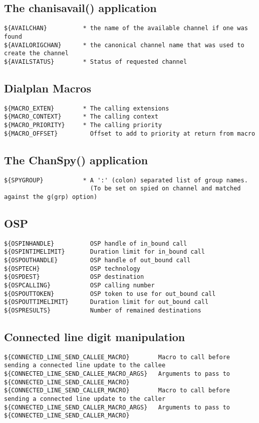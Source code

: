 \subsection{The chanisavail() application}
\begin{verbatim}
${AVAILCHAN}          * the name of the available channel if one was found
${AVAILORIGCHAN}      * the canonical channel name that was used to create the channel
${AVAILSTATUS}        * Status of requested channel
\end{verbatim}

\subsection{Dialplan Macros}
\begin{verbatim}
${MACRO_EXTEN}        * The calling extensions
${MACRO_CONTEXT}      * The calling context
${MACRO_PRIORITY}     * The calling priority
${MACRO_OFFSET}         Offset to add to priority at return from macro
\end{verbatim}

\subsection{The ChanSpy() application}
\begin{verbatim}
${SPYGROUP}           * A ':' (colon) separated list of group names.
                        (To be set on spied on channel and matched against the g(grp) option)
\end{verbatim}

\subsection{OSP}
\begin{verbatim}
${OSPINHANDLE}          OSP handle of in_bound call
${OSPINTIMELIMIT}       Duration limit for in_bound call
${OSPOUTHANDLE}         OSP handle of out_bound call
${OSPTECH}              OSP technology
${OSPDEST}              OSP destination
${OSPCALLING}           OSP calling number
${OSPOUTTOKEN}          OSP token to use for out_bound call
${OSPOUTTIMELIMIT}      Duration limit for out_bound call
${OSPRESULTS}           Number of remained destinations
\end{verbatim}

\subsection{Connected line digit manipulation}
\begin{verbatim}
${CONNECTED_LINE_SEND_CALLEE_MACRO}        Macro to call before sending a connected line update to the callee
${CONNECTED_LINE_SEND_CALLEE_MACRO_ARGS}   Arguments to pass to ${CONNECTED_LINE_SEND_CALLEE_MACRO}
${CONNECTED_LINE_SEND_CALLER_MACRO}        Macro to call before sending a connected line update to the caller
${CONNECTED_LINE_SEND_CALLER_MACRO_ARGS}   Arguments to pass to ${CONNECTED_LINE_SEND_CALLER_MACRO}
\end{verbatim}
